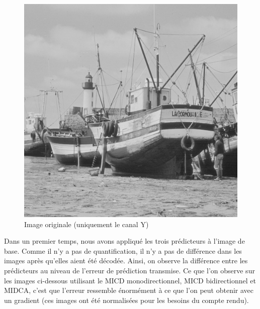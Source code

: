 \documentclass[12pt]{report}
\begin{document}
\begin{figure}[H]
\begin{center}
\includegraphics[scale=0.4]{../ImageRes/Imageoriginale.jpg} 
\caption{Image originale (uniquement le canal Y)}
\end{center}
\end{figure}

Dans un premier temps, nous avons appliqué les trois prédicteurs à l'image de base. Comme il n'y a pas de quantification, il n'y a pas de différence dans les images après qu'elles aient été décodée. Ainsi, on observe la différence entre les prédicteurs au niveau de l'erreur de prédiction transmise. 
Ce que l'on observe sur les images ci-dessous utilisant le MICD monodirectionnel, MICD bidirectionnel et MIDCA, c'est que l'erreur ressemble énormément à ce que l'on peut obtenir avec un gradient (ces images ont été normalisées pour les besoins du compte rendu). 
\end{document}
